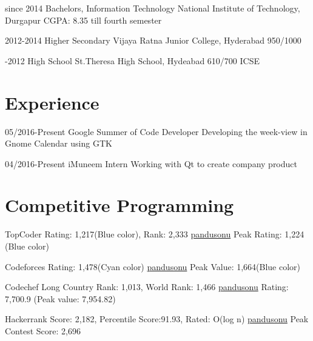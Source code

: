 \documentclass[]{friggeri-cv-a4}
\begin{document}
\begin{entrylist}

\entry
{since 2014}
{Bachelors, {\normalfont Information Technology}}
{National Institute of Technology, Durgapur}
{CGPA: 8.35 till fourth semester}
{}

\entry
{2012-2014}
{Higher Secondary}
{Vijaya Ratna Junior College, Hyderabad}
{950/1000}
{}

\entry
{-2012}
{High School}
{St.Theresa High School, Hydeabad}
{610/700 ICSE}
{}

\end{entrylist}


\section{\normalfont Experience}

\begin{entrylist}

\entry
{05/2016-Present}
{Google Summer of Code}
{Developer}
{Developing the week-view in Gnome Calendar using GTK}

\entry
{04/2016-Present}
{iMuneem}
{Intern}
{Working with Qt to create company product}

\end{entrylist}


\section{\normalfont Competitive Programming}

\begin{entrylist}

\entry
{TopCoder}
{Rating: 1,217(Blue color), Rank: 2,333}
{\href{https://www.topcoder.com/members/pandusonu/}{pandusonu}}
{Peak Rating: 1,224 (Blue color)}

\entry
{Codeforces}
{Rating: 1,478(Cyan color)}
{\href{http://codeforces.com/profile/pandusonu}{pandusonu}}
{Peak Value: 1,664(Blue color)}

\entry
{Codechef Long}
{Country Rank: 1,013, World Rank: 1,466}
{\href{http://www.codechef.com/users/pandusonu}{pandusonu}}
{Rating: 7,700.9 (Peak value: 7,954.82)}


\entry
{Hackerrank}
{Score: 2,182, Percentile Score:91.93, Rated: O(log n)}
{\href{https://www.hackerrank.com/pandusonu}{pandusonu}}
{Peak Contest Score: 2,696}

\end{entrylist}
\end{document}
